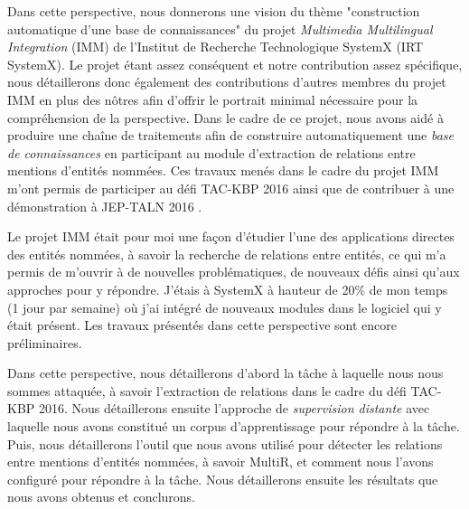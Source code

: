 \documentclass[12pt,a4paper,times,twoside,openright]{report}
\begin{document}
Dans cette perspective, nous donnerons une vision du thème "construction automatique d'une base de connaissances" du projet \textit{Multimedia Multilingual Integration} (IMM) de l'Institut de Recherche Technologique SystemX (IRT SystemX). Le projet étant assez conséquent et notre contribution assez spécifique, nous détaillerons donc également des contributions d'autres membres du projet IMM en plus des nôtres afin d'offrir le portrait minimal nécessaire pour la compréhension de la perspective. Dans le cadre de ce projet, nous avons aidé à produire une chaîne de traitements afin de construire automatiquement une \emph{base de connaissances} en participant au module d'extraction de relations entre mentions d'entités nommées. Ces travaux menés dans le cadre du projet IMM m'ont permis de participer au défi TAC-KBP 2016 \citep{rahman2017tac} ainsi que de contribuer à une démonstration à JEP-TALN 2016 \citep{mesnard2016}.

Le projet IMM était pour moi une façon d'étudier l'une des applications directes des entités nommées, à savoir la recherche de relations entre entités, ce qui m'a permis de m'ouvrir à de nouvelles problématiques, de nouveaux défis ainsi qu'aux approches pour y répondre. J'étais à SystemX à hauteur de 20\% de mon temps (1 jour par semaine) où j'ai intégré de nouveaux modules dans le logiciel qui y était présent. Les travaux présentés dans cette perspective sont encore préliminaires.

Dans cette perspective, nous détaillerons d'abord la tâche à laquelle nous nous sommes attaquée, à savoir l'extraction de relations dans le cadre du défi TAC-KBP 2016. Nous détaillerons ensuite l'approche de \emph{supervision distante} avec laquelle nous avons constitué un corpus d'apprentissage pour répondre à la tâche. Puis, nous détaillerons l'outil que nous avons utilisé pour détecter les relations entre mentions d'entités nommées, à savoir MultiR, et comment nous l'avons configuré pour répondre à la tâche. Nous détaillerons ensuite les résultats que nous avons obtenus et conclurons.


        
\end{document}
